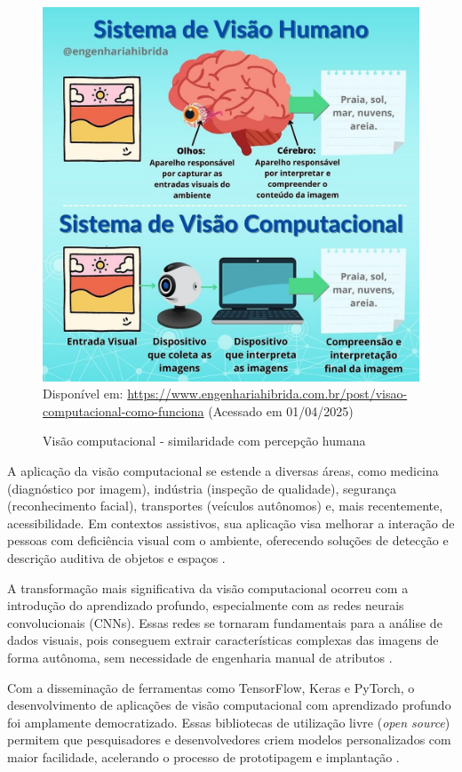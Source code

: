 \begin{figure}[htbp]
  \centering
  \caption{Visão computacional - similaridade com percepção humana}
  \includegraphics[width=0.8 \textwidth]{Figuras/visao-computacional.jpg}
  \\
  Disponível em: \url{https://www.engenhariahibrida.com.br/post/visao-computacional-como-funciona} (Acessado em 01/04/2025)
  \label{fg-visao-computacional}
\end{figure}

A aplicação da visão computacional se estende a diversas áreas, como medicina (diagnóstico por imagem), indústria (inspeção de qualidade), segurança (reconhecimento facial), transportes (veículos autônomos) e, mais recentemente, acessibilidade. Em contextos assistivos, sua aplicação visa melhorar a interação de pessoas com deficiência visual com o ambiente, oferecendo soluções de detecção e descrição auditiva de objetos e espaços \cite{goodfellow2016}.

A transformação mais significativa da visão computacional ocorreu com a introdução do aprendizado profundo, especialmente com as redes neurais convolucionais (CNNs). Essas redes se tornaram fundamentais para a análise de dados visuais, pois conseguem extrair características complexas das imagens de forma autônoma, sem necessidade de engenharia manual de atributos \cite{gu2018}.

Com a disseminação de ferramentas como TensorFlow, Keras e PyTorch, o desenvolvimento de aplicações de visão computacional com aprendizado profundo foi amplamente democratizado. Essas bibliotecas de utilização livre (\textit{open source}) permitem que pesquisadores e desenvolvedores criem modelos personalizados com maior facilidade, acelerando o processo de prototipagem e implantação \cite{hassaballah2020}.

